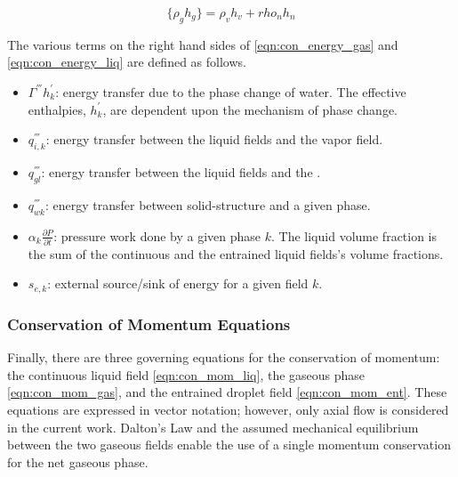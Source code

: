 \begin{equation}
\label{eqn:gaseous_enthalpy}
\{\rho_g h_g\} = \rho_v h_v + rho_n h_n
\end{equation}

The various terms on the right hand sides of \eqref{eqn:con_energy_gas} and \eqref{eqn:con_energy_liq} are defined as follows.
\begin{itemize}
\item{
$\Gamma^{'''} h^{'}_k$:
 energy transfer due to the phase change of water.
 The effective enthalpies, $h^{'}_k$, are dependent upon the mechanism of phase change.
}
\item{
$q^{'''}_{i,k}$:
energy transfer between the liquid fields and the vapor field.
}
\item{
$q^{'''}_{gl}$:
energy transfer between the liquid fields and the \ncgs{}.
}
\item{
$q^{'''}_{wk}$:
 energy transfer between solid-structure and a given phase.
}
\item{
$\alpha_k \frac{\partial P}{\partial t}$:
 pressure work done by a given phase $k$.
 The liquid volume fraction is the sum of the continuous and the entrained liquid fields's volume fractions.
}
\item{
$s_{e,k}$:
 external source/sink of energy for a given field $k$.
}
\end{itemize}

\subsubsection{Conservation of Momentum Equations}
\label{subsubsect:momentum_equations}

Finally, there are three governing equations for the conservation of momentum: the continuous liquid field \eqref{eqn:con_mom_liq}, the gaseous phase \eqref{eqn:con_mom_gas}, and the entrained droplet field \eqref{eqn:con_mom_ent}.
These equations are expressed in vector notation; however, only axial flow is considered in the current work.
Dalton's Law and the assumed mechanical equilibrium between the two gaseous fields enable the use of a single momentum conservation for the net gaseous phase.

